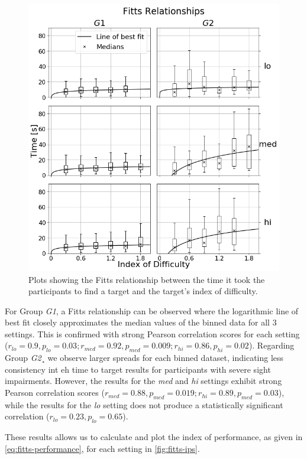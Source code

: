 \documentclass{article}
\begin{document}
\begin{figure}
  \centering
  \includegraphics[width=1.0\textwidth]{figures/fitts_fit.png}
  \caption{Plots showing the Fitts relationship between the time it took the participants to find a target and the target's index of difficulty. }\label{fig:fitts-results}
\end{figure}

For Group \textit{G1}, a Fitts relationship can be observed where the logarithmic line of best fit closely approximates the median values of the binned data for all 3 settings. 
This is confirmed with strong Pearson correlation scores for each setting ($r_{lo} = 0.9, p_{lo} = 0.03; r_{med} = 0.92, p_{med}=0.009; r_{hi} = 0.86, p_{hi} = 0.02$).
Regarding Group \textit{G2}¸ we observe larger spreads for each binned dataset, indicating less consistency int eh time to target results for participants with severe sight impairments.
However, the results for the \textit{med} and \textit{hi} settings exhibit strong Pearson correlation scores ($r_{med} = 0.88, p_{med} = 0.019; r_{hi} = 0.89, p_{med} = 0.03$), while the results for the \textit{lo} setting does not produce a statistically significant correlation ($r_{lo} = 0.23, p_{lo} = 0.65$).

These results allows us to calculate and plot the index of performance, as given in \cref{eq:fitts-performance}, for each setting in \cref{fig:fitts-ips}.
\end{document}
